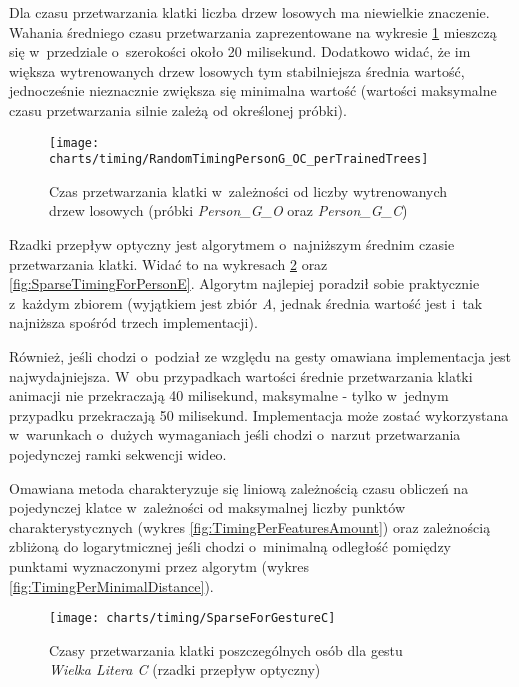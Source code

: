     Dla czasu przetwarzania klatki liczba drzew losowych ma niewielkie znaczenie. Wahania średniego czasu przetwarzania zaprezentowane na wykresie \ref{fig:TimingPerTrainedTreesAmount} mieszczą się w~przedziale o~szerokości około 20 milisekund. Dodatkowo widać, że im większa wytrenowanych drzew losowych tym stabilniejsza średnia wartość, jednocześnie nieznacznie zwiększa się minimalna wartość (wartości maksymalne czasu przetwarzania silnie zależą od określonej próbki).

    \begin{figure}[!ht]
      \centering
      \texttt{[image: charts/timing/RandomTimingPersonG\_OC\_perTrainedTrees]}
      \caption[Czas przetwarzania klatki w~zależności od liczby wytrenowanych drzew losowych]
              {Czas przetwarzania klatki w~zależności od liczby wytrenowanych drzew losowych (próbki \textit{Person\_G\_O} oraz \textit{Person\_G\_C})}
      \label{fig:TimingPerTrainedTreesAmount}
    \end{figure}

    \newpage
    Rzadki przepływ optyczny jest algorytmem o~najniższym średnim czasie przetwarzania klatki. Widać to na wykresach \ref{fig:SparseForGestureC} oraz \ref{fig:SparseTimingForPersonE}. Algorytm najlepiej poradził sobie praktycznie z~każdym zbiorem (wyjątkiem jest zbiór \textit{A}, jednak średnia wartość jest i~tak najniższa spośród trzech implementacji).

    Również, jeśli chodzi o~podział ze względu na gesty omawiana implementacja jest najwydajniejsza. W~obu przypadkach wartości średnie przetwarzania klatki animacji nie przekraczają 40 milisekund, maksymalne - tylko w~jednym przypadku przekraczają 50 milisekund. Implementacja może zostać wykorzystana w~warunkach o~dużych wymaganiach jeśli chodzi o~narzut przetwarzania pojedynczej ramki sekwencji wideo.

    Omawiana metoda charakteryzuje się liniową zależnością czasu obliczeń na pojedynczej klatce w~zależności od maksymalnej liczby punktów charakterystycznych (wykres \ref{fig:TimingPerFeaturesAmount}) oraz zależnością zbliżoną do logarytmicznej jeśli chodzi o~minimalną odległość pomiędzy punktami wyznaczonymi przez algorytm (wykres \ref{fig:TimingPerMinimalDistance}).

    \begin{figure}[!ht]
      \centering
      \texttt{[image: charts/timing/SparseForGestureC]}
      \caption[Czasy przetwarzania klatki poszczególnych osób dla gestu\\Wielka Litera C (rzadki przepływ optyczny)]
              {Czasy przetwarzania klatki poszczególnych osób dla gestu\\\textit{Wielka Litera C} (rzadki przepływ optyczny)}
      \label{fig:SparseForGestureC}
    \end{figure}

